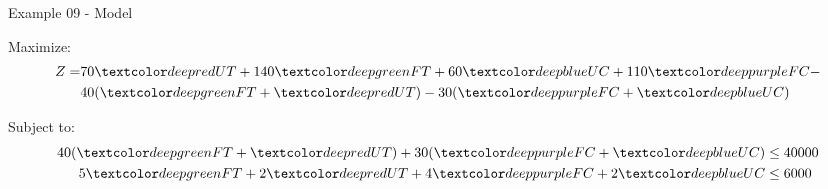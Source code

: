 \begin{frame}{Example 09 - Model}

Maximize:
\begin{align*}
    Z = &70\colora{UT} + 140\colorb{FT} + 60\colorc{UC} + 110\colord{FC} - \\
        &40(\colorb{FT} + \colora{UT}) - 30(\colord{FC} + \colorc{UC})
\end{align*}

Subject to:
\begin{align*}
    40(\colorb{FT} + \colora{UT}) + 30(\colord{FC} + \colorc{UC}) &\le 40000 \\
    5\colorb{FT} + 2\colora{UT} + 4\colord{FC} + 2\colorc{UC} &\le 6000
\end{align*}

\end{frame}
